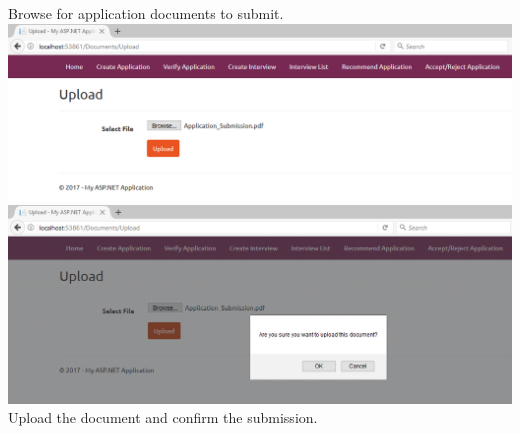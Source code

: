 \documentclass{article}
\begin{document}
\begin{center}
Browse for application documents to submit. \\ \bigskip
\includegraphics[scale=0.5]{CreateApplication8.png}\\
\includegraphics[scale=0.5]{CreateApplication9.png}\\
Upload the document and confirm the submission. \\ \bigskip
\end{center}
\end{document}
